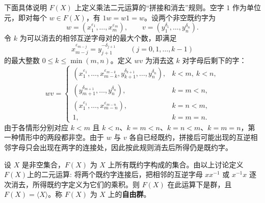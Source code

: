 \begin{purplenote}
下面具体说明 $F(X)$ 上定义乘法二元运算的“拼接和消去”规则。空字 $1$ 作为单位元，即对每个 $w\in F(X)$，有 $1w=w1=w$。设两个非空既约字为
\[
  w=(x_1^{\varepsilon_1},\ldots,x_m^{\varepsilon_m}),\qquad
  v=(y_1^{\delta_1},\ldots,y_n^{\delta_n}).
\]
令 $k$ 为可以消去的相邻互逆字母对的最大个数，即满足
\[
  x_{m-j}^{\varepsilon_{m-j}}=y_{j+1}^{-\delta_{j+1}}
  \qquad(j=0,1,\ldots,k-1)
\]
的最大整数 $0\leq k\leq\min(m,n)$。定义 $wv$ 为消去这 $k$ 对字母后剩下的字：
\[
  wv=
  \begin{cases}
    (x_1^{\varepsilon_1},\ldots,x_{m-k}^{\varepsilon_{m-k}},
      y_{k+1}^{\delta_{k+1}},\ldots,y_n^{\delta_n}),
      & k<m,\ k<n,\\[2pt]
    (y_{m+1}^{\delta_{m+1}},\ldots,y_n^{\delta_n}),
      & k=m<n,\\[2pt]
    (x_1^{\varepsilon_1},\ldots,x_{m-n}^{\varepsilon_{m-n}}),
      & k=n<m,\\[2pt]
    1, & k=m=n.
  \end{cases}
\]
由于各情形分别对应 $k<m$ 且 $k<n$、$k=m<n$、$k=n<m$、$k=m=n$，第一种情形中的两段都非空。由于 $w$ 与 $v$ 各自已经既约，拼接后可能出现的互逆相邻字母只会出现在两字的连接处，因此按此规则消去后所得仍是既约字。
\end{purplenote}

\begin{theorem}\label{thm:free-group-existence}
设 $X$ 是非空集合，$F(X)$ 为 $X$ 上所有既约字构成的集合。由以上讨论定义$F(X)$上的二元运算: 将两个既约字连接后，把相邻的互逆字母 $xx^{-1}$ 或 $x^{-1}x$ 逐次消去，所得既约字定义为它们的乘积。则 $F(X)$ 在此运算下是群，且$F(X)=\langle X\rangle$。称 $F(X)$ 为 $X$ 上的\textbf{自由群}。
\end{theorem}

